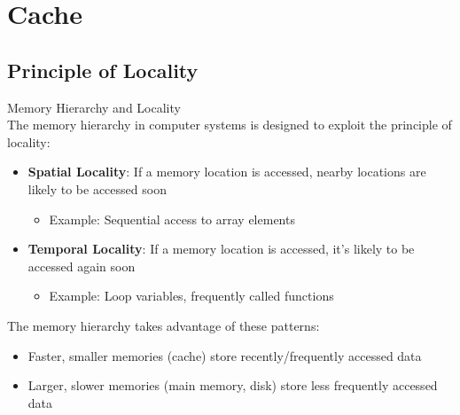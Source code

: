 \section{Cache}

\subsection{Principle of Locality}

\begin{concept}{Memory Hierarchy and Locality}\\
The memory hierarchy in computer systems is designed to exploit the principle of locality:
\begin{itemize}
    \item \textbf{Spatial Locality}: If a memory location is accessed, nearby locations are likely to be accessed soon
    \begin{itemize}
        \item Example: Sequential access to array elements
    \end{itemize}
    \item \textbf{Temporal Locality}: If a memory location is accessed, it's likely to be accessed again soon
    \begin{itemize}
        \item Example: Loop variables, frequently called functions
    \end{itemize}
\end{itemize}
The memory hierarchy takes advantage of these patterns:
\begin{itemize}
    \item Faster, smaller memories (cache) store recently/frequently accessed data
    \item Larger, slower memories (main memory, disk) store less frequently accessed data
\end{itemize}
\end{concept}

